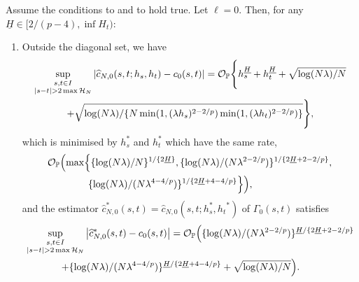 \documentclass{article}
\begin{document}
\begin{theorem}\label{thm:cov_unif_cv}
	Assume the conditions  to  and  to  hold true. Let $\ell=0$. Then, for any $\underline{H}\in[2/(p-4),\inf H_t)$:
	\begin{enumerate}
		\item \label{eq:thm:cov_unif_cv_out_diag} Outside the diagonal set, we have
			\begin{multline}
				\sup_{\substack{s, t \in I\\ |s - t| > 2\max\mathcal{H}_N}} \left|\widehat c_{N,0} (s,t;h_s,h_t) -  c_0 (s,t)\right| =  \mathcal{O}_{\mathbb{P}}\Biggl\{h_s^{\underline{H}} + h_t^{\underline{H}} +\sqrt{\log(N\lambda) / N} \\ + \sqrt{\log(N \lambda) /\{N\min(1, (\lambda h_s)^{2-2/p})\min(1, (\lambda h_t)^{2-2/p})\}}  \Biggr\},
			\end{multline}
			which is minimised by $h_s^*$ and $h_t^*$ which have the same rate,
			\begin{multline*}
				\mathcal{O}_{\mathbb{P}}\Bigl( \max\Bigl\{\{\log(N \lambda) / N\}^{ 1 / \{2 \underline{H}\}}, \{\log(N \lambda) / (N\lambda^{2-2/p})\}^{ 1 / \{2 \underline{H}+2-2/p \}}, \\ \{\log(N \lambda) / (N\lambda^{4-4/p})\}^{1 / \{2 \underline{H}+4-4/p \}} \Bigr\} \Bigr), \qquad\qquad
			\end{multline*}
			and the estimator $\widehat{c}_{N,0}^*(s,t) = \widehat c_{N,0}(s, t;h_s^*,{h_t}^*) $ of $\Gamma_0 (s,t)$ satisfies 
			\begin{multline*}
				\sup_{\substack{s, t \in I\\ |s - t| > 2\max\mathcal{H}_N}} \left|\widehat c_{N,0}^*(s,t) - c_0(s,t)\right|
				= \mathcal{O}_{\mathbb{P}}\Bigl( \{\log(N \lambda) / (N\lambda^{2-2/p})\}^{\underline{H} / \{2 \underline{H}+2-2/p \}} \\ + \{\log(N \lambda) / (N\lambda^{4-4/p})\}^{\underline{H} / \{2 \underline{H}+4-4/p \}} + \sqrt{\log(N\lambda)/N} \Bigr). \qquad
			\end{multline*}
	

\end{enumerate}
\end{theorem}
\end{document}
